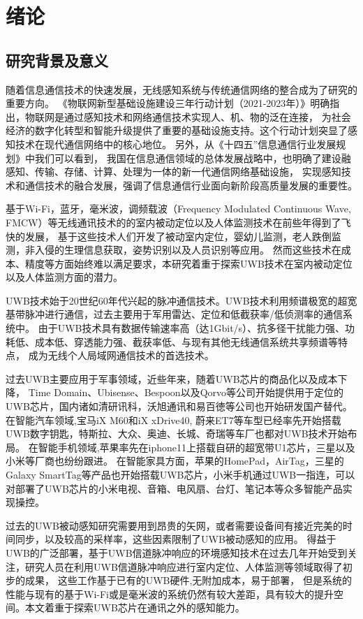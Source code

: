 \chapter{绪论}
\section{研究背景及意义}
随着信息通信技术的快速发展，无线感知系统与传统通信网络的整合成为了研究的重要方向。
《物联网新型基础设施建设三年行动计划（2021-2023年）》明确指出，物联网是通过感知技术和网络通信技术实现人、机、物的泛在连接，
为社会经济的数字化转型和智能升级提供了重要的基础设施支持\cite{IoTActionPlan2021}​​。这个行动计划突显了感知技术在现代通信网络中的核心地位。
另外，从《十四五”信息通信行业发展规划》中我们可以看到，
我国在信息通信领域的总体发展战略中，也明确了建设融感知、传输、存储、计算、处理为一体的新一代通信网络基础设施，
实现感知技术和通信技术的融合发展，强调了信息通信行业面向新阶段高质量发展的重要性\cite{14thFiveYearPlan}​​。

基于Wi-Fi，蓝牙，毫米波，调频载波（Frequency Modulated Continuous Wave,  FMCW）等无线通讯技术的的室内被动定位以及人体监测技术在前些年得到了飞快的发展，
基于这些技术人们开发了被动室内定位，婴幼儿监测，老人跌倒监测，非入侵的生理信息获取，姿势识别以及人员识别等应用。
然而这些技术在成本、精度等方面始终难以满足要求，本研究着重于探索UWB技术在室内被动定位以及人体监测方面的潜力。

UWB技术始于20世纪60年代兴起的脉冲通信技术。UWB技术利用频谱极宽的超宽基带脉冲进行通信，过去主要用于军用雷达、定位和低截获率/低侦测率的通信系统中\cite{uwb_history}。
由于UWB技术具有数据传输速率高（达1Gbit/s）、抗多径干扰能力强、功耗低、成本低、穿透能力强、截获率低、与现有其他无线通信系统共享频谱等特点\cite{uwb_survey}，
成为无线个人局域网通信技术的首选技术。

过去UWB主要应用于军事领域，近些年来，随着UWB芯片的商品化以及成本下降，
Time Domain、Ubisense、Bespoon以及Qorvo等公司开始提供用于定位的UWB芯片，国内诸如清研讯科，沃旭通讯和易百徳等公司也开始研发国产替代。
在智能汽车领域,宝马iX M60和iX xDrive40, 蔚来ET7等车型已经率先开始搭载UWB数字钥匙，特斯拉、大众、奥迪、长城、奇瑞等车厂也都对UWB技术开始布局。
在智能手机领域,苹果率先在iphone11上搭载自研的超宽带U1芯片，三星以及小米等厂商也纷纷跟进\cite{uwb_cellphone}。
在智能家具方面，苹果的HomePad，AirTag，三星的Galaxy SmartTag等产品也开始搭载UWB芯片，小米手机通过UWB一指连，可以对部署了UWB芯片的小米电视、音箱、电风扇、台灯、笔记本等众多智能产品实现操控。

过去的UWB被动感知研究需要用到昂贵的矢网，或者需要设备间有接近完美的时间同步，以及较高的采样率，这些因素限制了UWB被动感知的应用。
得益于UWB的广泛部署，基于UWB信道脉冲响应的环境感知技术在过去几年开始受到关注，研究人员在利用UWB信道脉冲响应进行室内定位、人体监测等领域取得了初步的成果，
这些工作基于已有的UWB硬件,无附加成本，易于部署，
但是系统的性能与现有的基于Wi-Fi或是毫米波的系统仍然有较大差距，具有较大的提升空间。本文着重于探索UWB芯片在通讯之外的感知能力。


